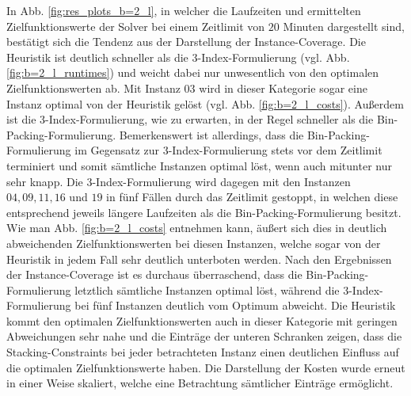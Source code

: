 In Abb. \ref{fig:res_plots_b=2_l}, in welcher die Laufzeiten und ermittelten Zielfunktionswerte der Solver bei
einem Zeitlimit von $20$ Minuten dargestellt sind, bestätigt sich die Tendenz aus der Darstellung der Instance-Coverage.
Die Heuristik ist deutlich schneller als die 3-Index-Formulierung (vgl. Abb. \ref{fig:b=2_l_runtimes}) und weicht dabei nur unwesentlich von den optimalen Zielfunktionswerten ab. Mit Instanz $03$ wird in dieser Kategorie sogar eine Instanz optimal von der Heuristik gelöst (vgl. Abb. \ref{fig:b=2_l_costs}). Außerdem ist die 3-Index-Formulierung, wie zu erwarten, in der Regel schneller als die Bin-Packing-Formulierung. Bemerkenswert ist allerdings, dass die Bin-Packing-Formulierung im Gegensatz zur 3-Index-Formulierung stets vor dem Zeitlimit terminiert und somit sämtliche Instanzen optimal löst, wenn auch mitunter nur sehr knapp.
Die 3-Index-Formulierung wird dagegen mit den Instanzen $04, 09, 11, 16$ und $19$ in fünf Fällen durch das Zeitlimit gestoppt, in welchen diese entsprechend jeweils längere Laufzeiten als die Bin-Packing-Formulierung besitzt.
Wie man Abb. \ref{fig:b=2_l_costs} entnehmen kann, äußert sich dies in deutlich abweichenden Zielfunktionswerten bei diesen Instanzen, welche sogar von der Heuristik in jedem Fall sehr deutlich unterboten werden.
Nach den Ergebnissen der Instance-Coverage ist es durchaus überraschend, dass die Bin-Packing-Formulierung letztlich sämtliche Instanzen optimal löst, während die 3-Index-Formulierung bei fünf Instanzen deutlich vom Optimum abweicht.
Die Heuristik kommt den optimalen Zielfunktionswerten auch in dieser Kategorie mit geringen Abweichungen sehr nahe
und die Einträge der unteren Schranken zeigen, dass die Stacking-Constraints bei jeder
betrachteten Instanz einen deutlichen Einfluss auf die optimalen Zielfunktionswerte haben.
Die Darstellung der Kosten wurde erneut in einer Weise skaliert, welche eine Betrachtung sämtlicher Einträge ermöglicht.


